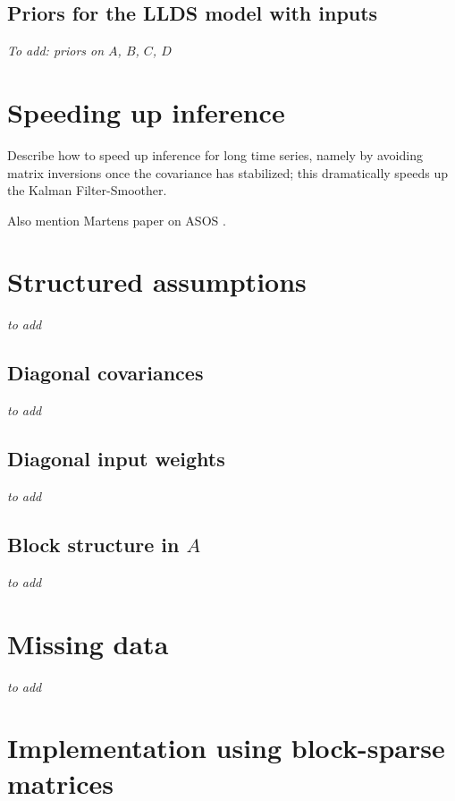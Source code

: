 \documentclass[10pt]{article}
\begin{document}
\begin{appendices}
\subsection{Priors for the LLDS model with inputs}
{\it To add:  priors on $A$, $B$, $C$, $D$}


\section{Speeding up inference}

Describe how to speed up inference for long time series, namely by avoiding matrix inversions once the covariance has stabilized; this dramatically speeds up the Kalman Filter-Smoother.

Also mention Martens paper on ASOS \citep{Martens2010LDS}.


\section{Structured assumptions}
{\it to add}

\subsection{Diagonal covariances}
{\it to add}

\subsection{Diagonal input weights}

{\it to add}

\subsection{Block structure in $A$}
{\it to add}
\section{Missing data}

{\it to add}    
\section{Implementation using block-sparse matrices}


\end{appendices}
\end{document}
